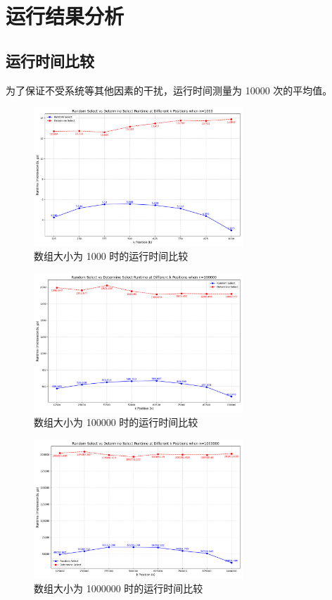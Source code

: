 \section{运行结果分析}
\subsection{运行时间比较}
为了保证不受系统等其他因素的干扰，运行时间测量为 10000 次的平均值。
\begin{figure}[H]
    \centering
    \includegraphics[width=0.7\textwidth]{../figure/1000.png}
    \caption{数组大小为 1000 时的运行时间比较}
\end{figure}
\begin{figure}[H]
    \centering
    \includegraphics[width=0.7\textwidth]{../figure/100000.png}
    \caption{数组大小为 100000 时的运行时间比较}
\end{figure}
\begin{figure}[H]
    \centering
    \includegraphics[width=0.7\textwidth]{../figure/1000000.png}
    \caption{数组大小为 1000000 时的运行时间比较}
\end{figure}
